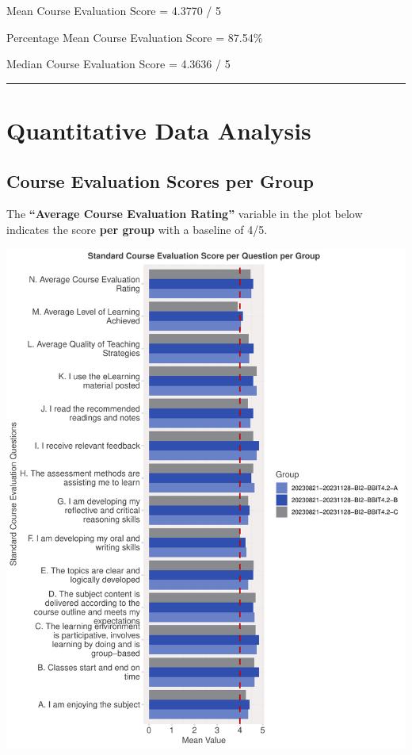 \documentclass[
]{article}
\begin{document}
Mean Course Evaluation Score = 4.3770 / 5

Percentage Mean Course Evaluation Score = 87.54\%

Median Course Evaluation Score = 4.3636 / 5

\begin{center}\rule{0.5\linewidth}{0.5pt}\end{center}

\newpage

\section{Quantitative Data Analysis}\label{quantitative-data-analysis}

\subsection{Course Evaluation Scores per
Group}\label{course-evaluation-scores-per-group}

The \textbf{``Average Course Evaluation Rating''} variable in the plot
below indicates the score \textbf{per group} with a baseline of 4/5.

\includegraphics{AnalysisOfCourseEvaluation-Notebook_files/figure-latex/VisualizationsForCourseEvaluationResultsperClassGroup-1.pdf}
\end{document}
